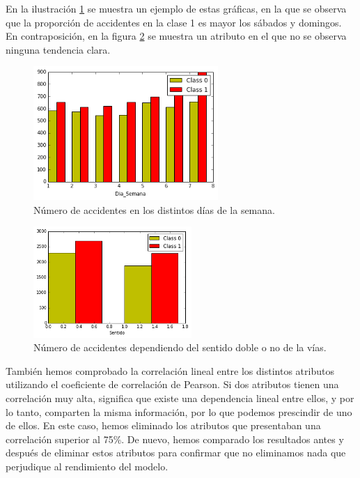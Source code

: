 \documentclass[journal,twoside]{JoPhA}
\begin{document}
En la ilustración \ref{fig:graf_tendencia} se muestra un ejemplo de estas gráficas, en la que se observa que la proporción de accidentes en la clase 1 es mayor los sábados y domingos. En contraposición, en la figura \ref{fig:graf_no_tendencia} se muestra un atributo en el que no se observa ninguna tendencia clara.

\begin{figure}[htb!]
	\begin{center}
		\includegraphics[width=7cm]{figs/dia_semana.png}
		\caption{Número de accidentes en los distintos días de la semana.}
	\end{center}
	\label{fig:graf_tendencia}
\end{figure}
\begin{figure}[htb!]
	\begin{center}
		\includegraphics[width=6cm]{figs/hora.png}
		\caption{Número de accidentes dependiendo del sentido doble o no de la vías.}
	\end{center}
	\label{fig:graf_no_tendencia}
\end{figure}

También hemos comprobado la correlación lineal entre los distintos atributos utilizando el coeficiente de correlación de Pearson. Si dos atributos tienen una correlación muy alta, significa que existe una dependencia lineal entre ellos, y por lo tanto, comparten la misma información, por lo que podemos prescindir de uno de ellos. En este caso, hemos eliminado los atributos que presentaban una correlación superior al 75\%. De nuevo, hemos comparado los resultados antes y después de eliminar estos atributos para confirmar que no eliminamos nada que perjudique al rendimiento del modelo. \\
\end{document}
